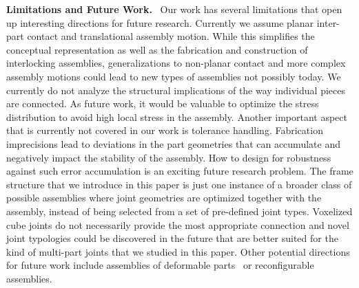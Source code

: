 \vspace*{2.0mm}
\noindent
{\bf Limitations and Future Work.} \
Our work has several limitations that open up interesting directions for future research.
Currently we assume planar inter-part contact and translational assembly motion.
While this simplifies the conceptual representation as well as the fabrication and construction of interlocking assemblies, generalizations to non-planar contact and more complex assembly motions could lead to new types of assemblies not possibly today. 
We currently do not analyze the structural implications of the way individual pieces are connected. 
As future work, it would be valuable to optimize the stress distribution to avoid high local stress in the assembly. 
Another important aspect that is currently not covered in our work is tolerance handling. Fabrication imprecisions lead to deviations in the part geometries that can accumulate and negatively impact the stability of the assembly. 
How to design for robustness against such error accumulation is an exciting future research problem.
The frame structure that we introduce in this paper is just one instance of a broader class of possible assemblies where joint geometries are optimized together with the assembly, instead of being selected from a set of pre-defined joint types. Voxelized cube joints do not necessarily provide the most appropriate connection and novel joint typologies could be discovered in the future that are better suited for the kind of multi-part joints that we studied in this paper. Other potential directions for future work include assemblies of deformable parts~\cite{Skouras-2015-InterlockElement} or reconfigurable assemblies.
 
 
 
 
 
 
 
 
 
 
 
 
 
 
